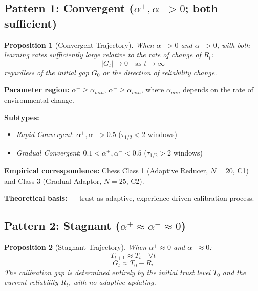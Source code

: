 \documentclass[12pt]{article}
\newtheorem{proposition}{Proposition}
\begin{document}
\subsection{Pattern 1: Convergent ($\alpha^+, \alpha^- > 0$; both sufficient)}

\begin{proposition}[Convergent Trajectory]
  When $\alpha^+ > 0$ and $\alpha^- > 0$, with both learning rates
  sufficiently large relative to the rate of change of $R_t$:
  \begin{equation}
    |G_t| \to 0 \quad \text{as } t \to \infty
  \end{equation}
  regardless of the initial gap $G_0$ or the direction of
  reliability change.
\end{proposition}

\textbf{Parameter region:} $\alpha^+ \geq \alpha_{min}$,
$\alpha^- \geq \alpha_{min}$, where $\alpha_{min}$ depends on the
rate of environmental change.

\textbf{Subtypes:}
\begin{itemize}
  \item \textit{Rapid Convergent}: $\alpha^+, \alpha^- > 0.5$
    ($\tau_{1/2} < 2$ windows)
  \item \textit{Gradual Convergent}: $0.1 < \alpha^+, \alpha^- < 0.5$
    ($\tau_{1/2} > 2$ windows)
\end{itemize}

\textbf{Empirical correspondence:}
Chess Class 1 (Adaptive Reducer, $N=20$, C1) and
Class 3 (Gradual Adaptor, $N=25$, C2).

\textbf{Theoretical basis:}
\citet{lee2004trust} --- trust as adaptive, experience-driven
calibration process.


\subsection{Pattern 2: Stagnant ($\alpha^+ \approx \alpha^- \approx 0$)}

\begin{proposition}[Stagnant Trajectory]
  When $\alpha^+ \approx 0$ and $\alpha^- \approx 0$:
  \begin{equation}
    T_{t+1} \approx T_t \quad \forall t
  \end{equation}
  \begin{equation}
    G_t \approx T_0 - R_t
  \end{equation}
  The calibration gap is determined entirely by the initial trust
  level $T_0$ and the current reliability $R_t$, with no adaptive
  updating.
\end{proposition}
\end{document}
